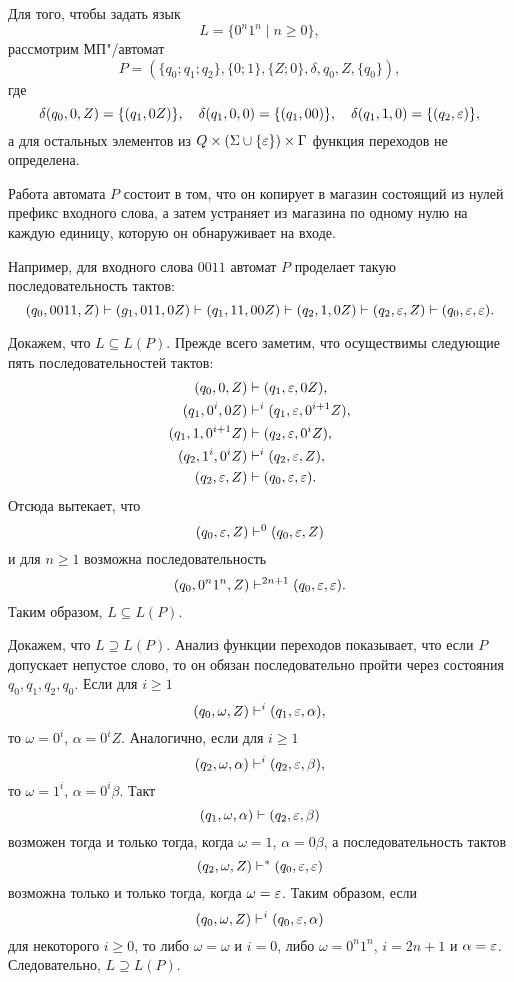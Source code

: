 \begin{myexample}
Для того, чтобы задать язык
\[L=\{0^n1^n\mid n\ge 0\},\]
рассмотрим МП"/автомат
\[P=(\{q_0;q_1;q_2\},\{0;1\},\{Z;0\},\delta,q_0,Z,\{q_0\}),\]
где
\[
\delta(q_0,0,Z)=\{(q_1,0Z)\}, \quad
    \delta(q_1,0,0)=\{(q_1,00)\}, \quad
    \delta(q_1,1,0)=\{(q_2,\varepsilon)\},
\]
а для остальных элементов из $Q\times(\Sigma\cup\{\varepsilon\})\times\Gamma$ функция переходов не определена.

Работа автомата $P$ состоит в том, что он копирует в магазин состоящий из нулей префикс входного слова, а затем устраняет из магазина по одному нулю на каждую единицу, которую он обнаруживает на входе.

Например, для входного слова $0011$ автомат $P$ проделает такую последовательность тактов:
\[
    (q_0,0011,Z) \vdash (g_1,011,0Z) \vdash
        (q_1,11,00Z) \vdash (q_2,1,0Z) \vdash
        (q_2,\varepsilon,Z)\vdash(q_0,\varepsilon,\varepsilon).
\]

Докажем, что $L\subseteq L(P)$. Прежде всего заметим, что осуществимы следующие пять последовательностей тактов:
\begin{align*}
(q_0,0,Z)           &\vdash      (q_1,\varepsilon,0Z), \\
(q_1,0^i,0Z)        &\vdash^i    (q_1,\varepsilon,0^{i+1}Z), \\
(q_1,1,0^{i+1}Z)    &\vdash      (q_2,\varepsilon,0^iZ), \\
(q_2,1^i,0^iZ)      &\vdash^i    (q_2,\varepsilon,Z), \\
(q_2,\varepsilon,Z)       &\vdash      (q_0,\varepsilon,\varepsilon).
\end{align*}
Отсюда вытекает, что
\[
(q_0,\varepsilon,Z) \vdash^0 (q_0,\varepsilon,Z)
\]
и для $n \ge 1$ возможна последовательность
\[
(q_0,0^n1^n,Z) \vdash^{2n+1} (q_0, \varepsilon, \varepsilon).
\]
Таким образом, $L\subseteq L(P)$.

Докажем, что $L\supseteq L(P)$. Анализ функции переходов показывает, что если $P$ допускает непустое слово, то он обязан последовательно пройти через состояния $q_0, q_1, q_2, q_0$. Если для $i\ge 1$
\[
(q_0,\omega,Z)\vdash^i(q_1,\varepsilon,\alpha),
\]
то $\omega=0^i$, $\alpha=0^iZ$. Аналогично, если для $i\ge 1$
\[
(q_2,\omega,\alpha)\vdash^i(q_2,\varepsilon,\beta),
\]
то $\omega=1^i$, $\alpha=0^i\beta$. Такт
\[
(q_1,\omega,\alpha)\vdash(q_2,\varepsilon,\beta)
\]
возможен тогда и только тогда, когда $\omega=1$, $\alpha=0\beta$, а последовательность тактов
\[
(q_2,\omega,Z)\vdash^*(q_0,\varepsilon,\varepsilon)
\]
возможна только и только тогда, когда $\omega=\varepsilon$. Таким образом, если
\[
(q_0,\omega,Z) \vdash^i (q_0,\varepsilon,\alpha)
\]
для некоторого $i\ge 0$, то либо $\omega=\omega$ и $i=0$, либо $\omega=0^n1^n$, $i=2n+1$ и $\alpha=\varepsilon$. Следовательно, $L\supseteq L(P)$.
\end{myexample}

